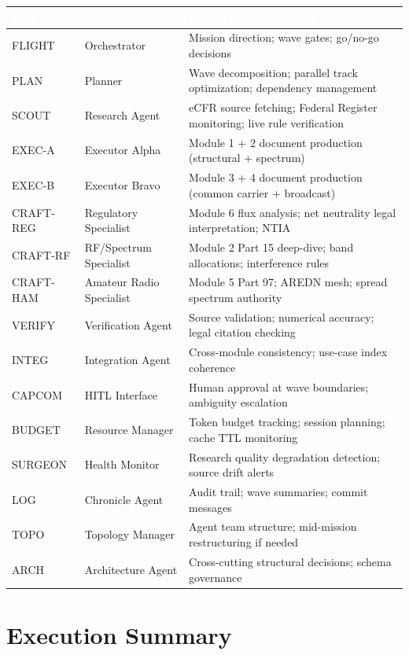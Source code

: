 \documentclass[11pt,letterpaper]{article}
\newcommand{\tableheader}[1]{\textbf{\sffamily\textcolor{white}{#1}}}
\begin{document}
\begin{center}
\begin{tabularx}{\textwidth}{L{2cm}L{3.5cm}X}
\toprule
{}
\tableheader{Role} & \tableheader{Agent} & \tableheader{Primary Responsibility} \\
\midrule
FLIGHT & Orchestrator & Mission direction; wave gates; go/no-go decisions \\
PLAN & Planner & Wave decomposition; parallel track optimization; dependency management \\
SCOUT & Research Agent & eCFR source fetching; Federal Register monitoring; live rule verification \\
EXEC-A & Executor Alpha & Module 1 + 2 document production (structural + spectrum) \\
EXEC-B & Executor Bravo & Module 3 + 4 document production (common carrier + broadcast) \\
CRAFT-REG & Regulatory Specialist & Module 6 flux analysis; net neutrality legal interpretation; NTIA \\
CRAFT-RF & RF/Spectrum Specialist & Module 2 Part 15 deep-dive; band allocations; interference rules \\
CRAFT-HAM & Amateur Radio Specialist & Module 5 Part 97; AREDN mesh; spread spectrum authority \\
VERIFY & Verification Agent & Source validation; numerical accuracy; legal citation checking \\
INTEG & Integration Agent & Cross-module consistency; use-case index coherence \\
CAPCOM & HITL Interface & Human approval at wave boundaries; ambiguity escalation \\
BUDGET & Resource Manager & Token budget tracking; session planning; cache TTL monitoring \\
SURGEON & Health Monitor & Research quality degradation detection; source drift alerts \\
LOG & Chronicle Agent & Audit trail; wave summaries; commit messages \\
TOPO & Topology Manager & Agent team structure; mid-mission restructuring if needed \\
ARCH & Architecture Agent & Cross-cutting structural decisions; schema governance \\
\bottomrule
\end{tabularx}
\end{center}

\section{Execution Summary}
\end{document}
